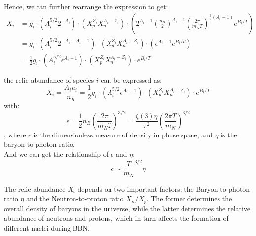 \begin{foundation}
    Hence, we can further rearrange the expression to get:
    \begin{align*}
        X_i &= g_i \cdot \left(A_i^{5/2} 2^{-A_i}\right) \cdot  \left(X_p^{Z_i} X_n^{A_i - Z_i}\right) \cdot \left( 2^{A_i - 1} (\frac{n_B}{2})^{A_i - 1} (\frac{2\pi}{m_N T})^{\frac{3}{2}(A_i - 1)} e^{B_i / T} \right) \\
            &= g_i \cdot \left(A_i^{5/2} 2^{-A_i+ A_i - 1}\right) \cdot  \left(X_p^{Z_i} X_n^{A_i - Z_i}\right) \cdot \left( \epsilon^{A_i - 1} e^{B_i / T} \right) \\
            &= \frac{1}{2} g_i \cdot \left(A_i^{5/2} \epsilon^{A_i - 1}\right) \cdot \left(X_p^{Z_i} X_n^{A_i - Z_i}\right) \cdot e^{B_i / T}
    \end{align*}
\end{foundation}

\bigskip \noindent
\begin{theory}
   the relic abundance of species $i$ can be expressed as:
    \[
        X_i = \frac{A_i n_i}{n_B} = \frac{1}{2}g_i \cdot \left(A_i^{5/2} \epsilon^{A_i - 1}\right) \cdot \left( X_p^{Z_i} X_n^{A_i - Z_i} \right) \cdot e^{B_i / T}
    \]
    with:
    \[
        \epsilon = \frac{1}{2} n_B \left( \frac{2\pi}{m_N T} \right)^{3/2} = \frac{\zeta(3) \eta}{\pi^2} \left( \frac{2\pi T}{m_N} \right)^{3/2} 
    \],
    where $\epsilon$ is the dimensionless measure of density in phase space, and $\eta$ is the baryon-to-photon ratio. \\

    And we can get the relationship of $\epsilon$ and $\eta$:
    \[
        \epsilon \sim \frac{T}{m_N}^{3/2} \eta
    \]
\end{theory}

\begin{remark}
    The relic abundance $X_i$ depends on two important factors: the Baryon-to-photon ratio $\eta$ and the Neutron-to-proton ratio $X_n / X_p$. The former determines the overall density of baryons in the universe, while the latter determines the relative abundance of neutrons and protons, which in turn affects the formation of different nuclei during BBN. \\
\end{remark}

\bigskip \noindent \bigskip \noindent \bigskip \noindent
